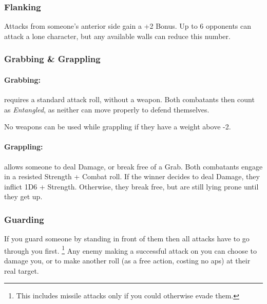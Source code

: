 \begin{multicols}{2}

\subsubsection[Flanking: Gain +2 to attack]{Flanking}\label{flank}

Attacks from someone's anterior side gain a +2 Bonus.
Up to 6 opponents can attack a lone character, but any available walls can reduce this number.

\subsubsection{Grabbing \& Grappling}
\label{grappling}

\paragraph[Grabs: Make an attack without any weapon bonus. Both combatants are \textit{Entangled}. Cost: 1 \gls{ap}]{Grabbing:}
requires a standard attack roll, without a weapon.
Both combatants then count as \textit{Entangled}, as neither can move properly to defend themselves.
\label{grab}

No weapons can be used while grappling if they have a \gls{weight} above -2.

\paragraph[Grapple: Make an opposted roll of Strength + Combat.  Success means the combatant can either break free or inflict Damage.  Cost: 3 \gls{ap}]{Grappling:}
allows someone to deal Damage, or break free of a Grab.
Both combatants engage in a resisted Strength + Combat roll.
If the winner decides to deal Damage, they inflict 1D6 + Strength.
Otherwise, they break free, but are still lying prone until they get up.
\label{grapple}

\subsubsection[Guard: Someone must successfully hit you before they are allowed to hit whomever you are guarding. Cost: 1 \gls{ap}]{Guarding}

If you guard someone by standing in front of them then all attacks have to go through you first.%
\footnote{This includes missile attacks only if you could otherwise evade them.}
Any enemy making a successful attack on you can choose to damage you, or to make another roll (as a free action, costing no \glspl{ap}) at their real target.


\end{multicols}
